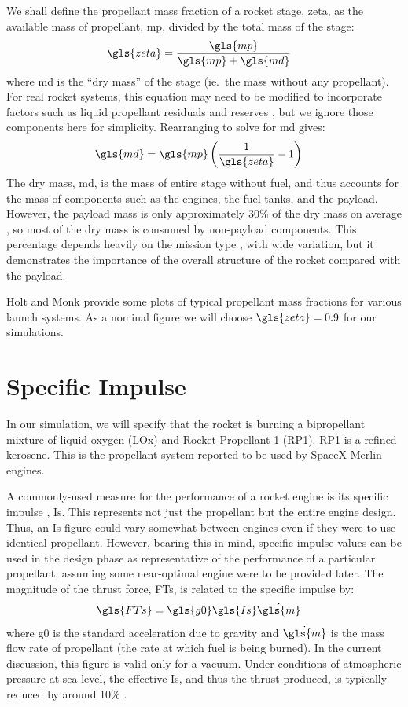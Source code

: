 \documentclass[12pt,openany]{book}
\begin{document}
We shall define the propellant mass fraction of a rocket stage, \gls{zeta}, as the available mass of propellant, \gls{mp}, divided by the total mass of the stage:
\begin{align}
  \gls{zeta} &= \frac{\gls{mp}}{\gls{mp} + \gls{md}}
\end{align}
where \gls{md} is the ``dry mass'' of the stage (ie.\ the mass without any propellant). For real rocket systems, this equation may need to be modified to incorporate factors such as liquid propellant residuals and reserves \cite{holt2009}, but we ignore those components here for simplicity. Rearranging to solve for \gls{md} gives:
\begin{align}
  \gls{md} &= \gls{mp} \left(\frac{1}{\gls{zeta}} - 1\right)
\end{align}
The dry mass, \gls{md}, is the mass of entire stage without fuel, and thus accounts for the mass of components such as the engines, the fuel tanks, and the payload. However, the payload mass is only approximately 30\% of the dry mass on average \cite{springmann2004}, so most of the dry mass is consumed by non-payload components. This percentage depends heavily on the mission type \cite{gerberich2013}, with wide variation, but it demonstrates the importance of the overall structure of the rocket compared with the payload.

Holt and Monk \cite{holt2009} provide some plots of typical propellant mass fractions for various launch systems. As a nominal figure we will choose \(\gls{zeta}=0.9\) for our simulations.

\section{Specific Impulse}

In our simulation, we will specify that the rocket is burning a bipropellant mixture of liquid oxygen (LOx) and Rocket Propellant-1 (RP1). RP1 is a refined kerosene. This is the propellant system reported to be used by SpaceX Merlin engines.

A commonly-used measure for the performance of a rocket engine is its specific impulse \cite{huzel1967}, \gls{Is}. This represents not just the propellant but the entire engine design. Thus, an \gls{Is} figure could vary somewhat between engines even if they were to use identical propellant. However, bearing this in mind, specific impulse values can be used in the design phase as representative of the performance of a particular propellant, assuming some near-optimal engine were to be provided later. The magnitude of the thrust force, \gls{FTs}, is related to the specific impulse by:
\begin{align}
  \gls{FTs} &= \gls{g0} \gls{Is} \dot{\gls{m}}
\end{align}
where \gls{g0} is the standard acceleration due to gravity and \(\dot{\gls{m}}\) is the mass flow rate of propellant (the rate at which fuel is being burned). In the current discussion, this figure is valid only for a vacuum. Under conditions of atmospheric pressure at sea level, the effective \gls{Is}, and thus the thrust produced, is typically reduced by around 10\% \cite{kephart1971}.
\end{document}
